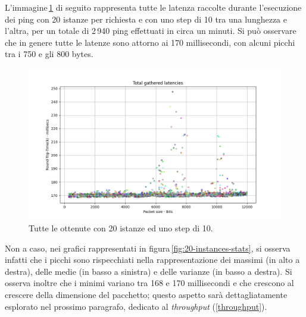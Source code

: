 \noindent L'immagine\,\ref{fig:20-instances-total} di seguito rappresenta tutte le latenza raccolte durante l'esecuzione dei ping con 20 istanze per richiesta e con uno step di 10 tra una lunghezza e l'altra, per un totale di 2\,940 ping effettuati in circa un minuti. Si può osservare che in genere tutte le latenze sono attorno ai 170 millisecondi, con alcuni picchi tra i 750 e gli 800 bytes.
\begin{figure}[h]
    \centering
    \includegraphics[width = .9\textwidth]{hw-2/report/imgs/20-instances/la-total-latencies.png}
    \caption{Tutte le ottenute con 20 istanze ed uno step di 10.}
    \label{fig:20-instances-total}
\end{figure}
Non a caso, nei grafici rappresentati in figura\,\ref{fig:20-instances-stats}, si osserva infatti che i picchi sono rispecchiati nella rappresentazione dei massimi (in alto a destra), delle medie (in basso a sinistra) e delle varianze (in basso a destra). Si osserva inoltre che i minimi variano tra 168 e 170 millisecondi e che crescono al crescere della dimensione del pacchetto; questo aspetto sarà dettagliatamente esplorato nel prossimo paragrafo, dedicato al \textsl{throughput} (\ref{throughput}).
